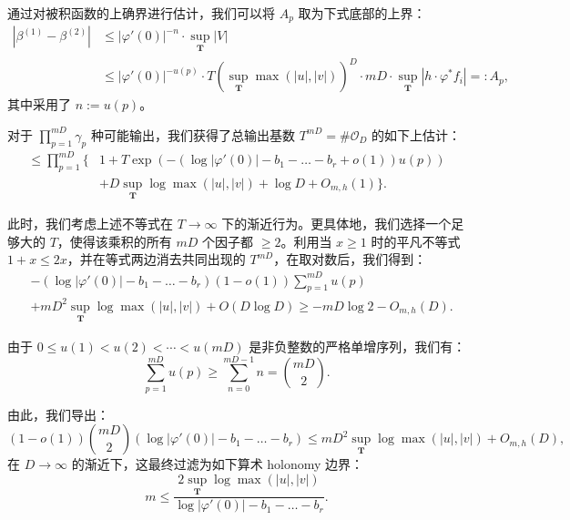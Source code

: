 通过对被积函数的上确界进行估计，我们可以将 \(A_p\) 取为下式底部的上界：
\begin{equation}\label{eq:B.3.2}
\begin{aligned}
\left| \beta^{(1)} - \beta^{(2)} \right| &\le |\varphi'(0)|^{-n} \cdot \sup_{\mathbf{T}} |V| \\
&\le |\varphi'(0)|^{-u(p)} \cdot T \left( \sup_{\mathbf{T}} \max(|u|, |v|) \right)^{D} \cdot mD \cdot \sup_{\mathbf{T}} |h \cdot \varphi^* f_i| =: A_p,
\end{aligned}
\end{equation}
其中采用了 \(n := u(p)\)。

对于 \(\prod_{p=1}^{mD} \gamma_p\) 种可能输出，我们获得了总输出基数 \(T^{mD} = \#\mathcal{O}_D\) 的如下上估计：
\[
\begin{aligned}
\le \prod_{p=1}^{mD} \Big\{ &1 + T \exp\left(-\left(\log|\varphi'(0)| - b_1 - \dots - b_r + o(1)\right) u(p)\right) \\
&+ D \sup_{\mathbf{T}} \log \max(|u|, |v|) + \log D + O_{m,h}(1)\Big\}.
\end{aligned}
\]

此时，我们考虑上述不等式在 \(T \to \infty\) 下的渐近行为。更具体地，我们选择一个足够大的 \(T\)，使得该乘积的所有 \(mD\) 个因子都 \(\ge 2\)。利用当 \(x \ge 1\) 时的平凡不等式 \(1 + x \le 2x\)，并在等式两边消去共同出现的 \(T^{mD}\)，在取对数后，我们得到：
\[
\begin{aligned}
&-(\log |\varphi'(0)| - b_1 - \dots - b_r)(1 - o(1)) \sum_{p=1}^{mD} u(p) \\
&+ mD^2 \sup_{\mathbf{T}} \log \max(|u|, |v|) + O(D \log D) \ge -mD \log 2 - O_{m,h}(D).
\end{aligned}
\]

由于 \(0 \le u(1) < u(2) < \cdots < u(mD)\) 是非负整数的严格单增序列，我们有：
\begin{equation}\label{eq:B.3.3}
\sum_{p=1}^{mD} u(p) \ge \sum_{n=0}^{mD-1} n = \binom{mD}{2}.
\end{equation}

由此，我们导出：
\begin{equation}\label{eq:B.3.4}
(1-o(1))\binom{mD}{2}\left(\log|\varphi'(0)|-b_1-\dots-b_r\right) \le mD^2 \sup_{\mathbf{T}}\log\max(|u|,|v|)+O_{m,h}(D),
\end{equation}
在 \(D \to \infty\) 的渐近下，这最终过滤为如下算术 holonomy 边界：
\begin{equation}\label{eq:B.3.5}
m \le \frac{2\sup_{\mathbf{T}}\log\max(|u|,|v|)}{\log|\varphi'(0)| - b_1 - \dots - b_r}.
\end{equation}

